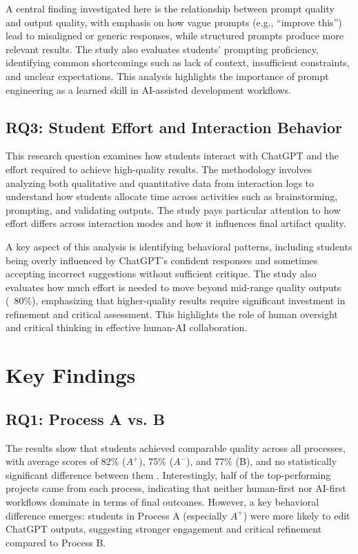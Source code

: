 A central finding investigated here is the relationship between prompt quality and output quality, with emphasis on how vague prompts (e.g., “improve this”) lead to misaligned or generic responses, while structured prompts produce more relevant results. The study also evaluates students' prompting proficiency, identifying common shortcomings such as lack of context, insufficient constraints, and unclear expectations. This analysis highlights the importance of prompt engineering as a learned skill in AI-assisted development workflows.

\subsection{RQ3: Student Effort and Interaction Behavior}
This research question examines how students interact with ChatGPT and the effort required to achieve high-quality results. The methodology involves analyzing both qualitative and quantitative data from interaction logs to understand how students allocate time across activities such as brainstorming, prompting, and validating outputs. The study pays particular attention to how effort differs across interaction modes and how it influences final artifact quality.

A key aspect of this analysis is identifying behavioral patterns, including students being overly influenced by ChatGPT's confident responses and sometimes accepting incorrect suggestions without sufficient critique. The study also evaluates how much effort is needed to move beyond mid-range quality outputs (~80\%), emphasizing that higher-quality results require significant investment in refinement and critical assessment. This highlights the role of human oversight and critical thinking in effective human-AI collaboration.

\section{Key Findings}

\subsection{RQ1: Process A vs. B}
The results show that students achieved comparable quality across all processes, with average scores of 82\% ($A^+$), 75\% ($A^-$), and 77\% (B), and no statistically significant difference between them . Interestingly, half of the top-performing projects came from each process, indicating that neither human-first nor AI-first workflows dominate in terms of final outcomes. However, a key behavioral difference emerges: students in Process A (especially $A^+$) were more likely to edit ChatGPT outputs, suggesting stronger engagement and critical refinement compared to Process B.

